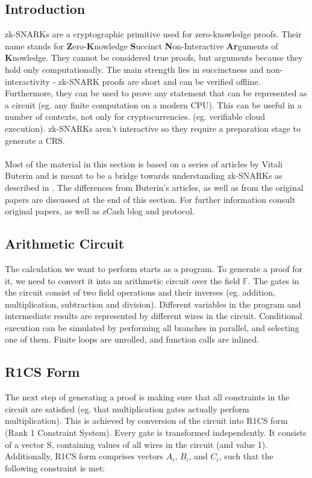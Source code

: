 \subsection{Introduction}
zk-SNARKs are a cryptographic primitive used for zero-knowledge proofs. Their name stands for \textbf{Z}ero-\textbf{K}nowledge \textbf{S}uccinct \textbf{N}on-Interactive \textbf{Ar}guments of \textbf{K}nowledge. They cannot be considered true proofs, but arguments because they hold only computationally. The main strength lies in succinctness and non-interactivity - zk-SNARK proofs are short and can be verified offline. Furthermore, they can be used to prove any statement that can be represented as a circuit (eg. any finite computation on a modern CPU). This can be useful in a number of contexts, not only for cryptocurrencies. (eg. verifiable cloud execution). zk-SNARKs aren't interactive so they require a preparation stage to generate a CRS.\\
\\
Most of the material in this section is based on a series of articles by Vitali Buterin\cite{buterin1, buterin2, buterin3} and is meant to be a bridge towards understanding zk-SNARKs as described in \cite{parno2013pinocchio, ben2014succinct, groth2016size}. The differences from Buterin's articles, as well as from the original papers are discussed at the end of this section. For further information consult original papers\cite{parno2013pinocchio, ben2014succinct, groth2016size, sasson2014zerocash}, as well as zCash blog\cite{zcashzksnarks} and protocol\cite{zcashprotocol}. %

\subsection{Arithmetic Circuit}

The calculation we want to perform starts as a program. To generate a proof for it, we need to convert it into an arithmetic circuit over the field $\mathbb{F}$. The gates in the circuit consist of two field operations and their inverses (eg. addition, multiplication, subtraction and division). Different variables in the program and intermediate results are represented by different wires in the circuit. Conditional execution can be simulated by performing all branches in parallel, and selecting one of them. Finite loops are unrolled, and function calls are inlined.

\subsection{R1CS Form}
The next step of generating a proof is making sure that all constraints in the circuit are satisfied (eg. that multiplication gates actually perform multiplication). This is achieved by conversion of the circuit into R1CS form (Rank 1 Constraint System). Every gate is transformed independently. It consists of a vector S, containing values of all wires in the circuit (and value 1). Additionally, R1CS form comprises vectors $A_i$, $B_i$, and $C_i$, such that the following constraint is met:

